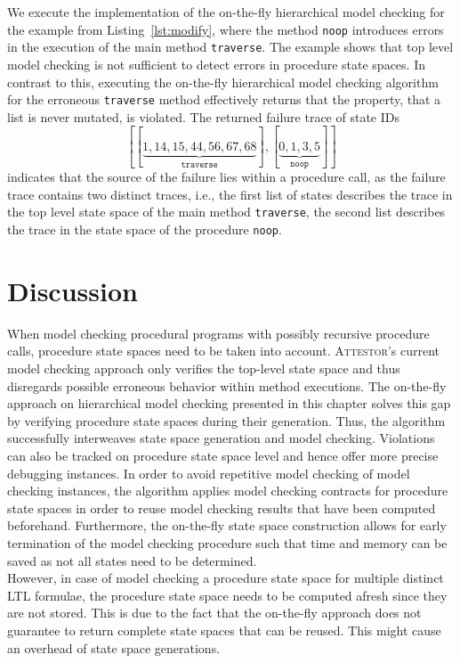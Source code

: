 \documentclass[a4paper, 12pt, twoside]{report}
\begin{document}
	We execute the implementation of the on-the-fly hierarchical model checking for the example from Listing~\ref{lst:modify}, where the method \texttt{noop} introduces errors in the execution of the main method \texttt{traverse}. The example shows that top level model checking is not sufficient to detect errors in procedure state spaces. In contrast to this, executing the on-the-fly hierarchical model checking algorithm for the erroneous \texttt{traverse} method effectively returns that the property, that a list is never mutated, is violated. The returned failure trace of state IDs \[[[\underbrace{1, 14, 15, 44, 56, 67, 68}_{\texttt{traverse}}], [\underbrace{0, 1, 3, 5}_{\texttt{noop}}]]\] indicates that the source of the failure lies within a procedure call, as the failure trace contains two distinct traces, i.e., the first list of states describes the trace in the top level state space of the main method \texttt{traverse}, the second list describes the trace in the state space of the procedure \texttt{noop}.
	
	\section{Discussion}
	
	When model checking procedural programs with possibly recursive procedure calls, procedure state spaces need to be taken into account. \textsc{Attestor}'s current model checking approach only verifies the top-level state space and thus disregards possible erroneous behavior within method executions. The on-the-fly approach on hierarchical model checking presented in this chapter solves this gap by verifying procedure state spaces during their generation. Thus, the algorithm successfully interweaves state space generation and model checking. Violations can also be tracked on procedure state space level and hence offer more precise debugging instances. In order to avoid repetitive model checking of model checking instances, the algorithm applies model checking contracts for procedure state spaces in order to reuse model checking results that have been computed beforehand. Furthermore, the on-the-fly state space construction allows for early termination of the model checking procedure such that time and memory can be saved as not all states need to be determined. \\
	
	However, in case of model checking a procedure state space for multiple distinct LTL formulae, the procedure state space needs to be computed afresh since they are not stored. This is due to the fact that the on-the-fly approach does not guarantee to return complete state spaces that can be reused. This might cause an overhead of state space generations.\\
	
\end{document}
